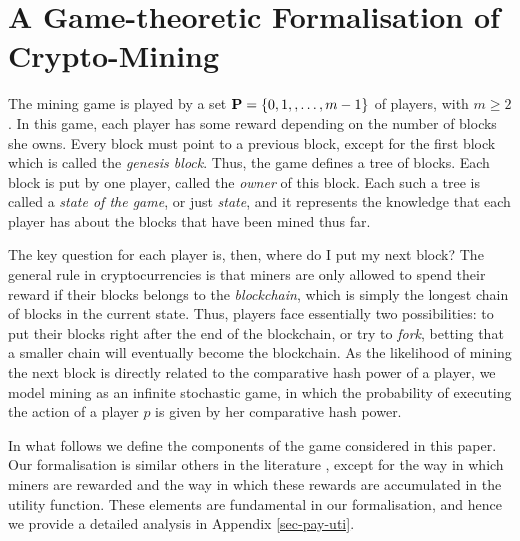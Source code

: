 
\section{A Game-theoretic Formalisation of Crypto-Mining}
\label{sec-formalization}

The mining game is played by a set $\mathbf{P} = \{0, 1, , \ldots, m-1\}$ of players, with $m \geq 2$.
In this game, each player has some reward depending on the number of blocks she owns. Every block must point to a previous block, except for the first block which is called the {\em genesis block}. Thus, the game defines a tree of blocks. Each block is put by one player, called the {\em owner} of this block. Each such a tree is called a {\em state of the game}, or just {\em state}, and it represents the knowledge that each player has about the blocks that have been mined thus far.

The key question for each player is, then, where do I put my next block? The general rule in cryptocurrencies is that miners are only allowed to spend their reward if their blocks belongs to the \emph{blockchain}, which is simply the longest chain of blocks in the current state. Thus, players face essentially two possibilities: to put their blocks right after the end of the blockchain, or try to \emph{fork}, betting that a smaller chain will eventually become the blockchain. As the likelihood of mining the next block is directly related to the comparative hash power of a player, we model mining as an infinite stochastic game, in which the probability of executing the action of a player $p$ is given by her comparative hash power.

In what follows we define the components of the game considered in this paper. Our formalisation is similar others in the literature \cite{mininggames:2016,koutsoupias2018blockchain}, except for the way in which miners are rewarded and the way in which these rewards are accumulated in the utility function. These elements are fundamental in our formalisation, and  hence we provide a detailed analysis in Appendix \ref{sec-pay-uti}. 

